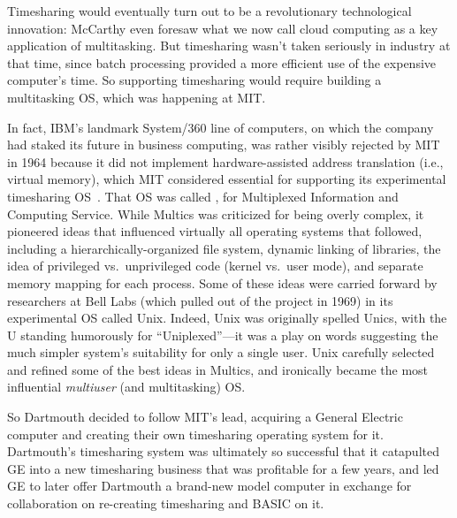 Timesharing would eventually turn out to be a revolutionary
technological innovation: McCarthy even foresaw what we now call cloud
computing as a key application of multitasking.
But timesharing wasn't taken seriously in industry at that time, since batch
processing provided a more efficient use of the expensive computer's
time.  So supporting
timesharing would require building a multitasking OS, which 
was happening at MIT.

  \begin{tangent}
In fact, IBM's landmark System/360 line of computers, on which the
company had staked its future in business computing, was rather visibly
rejected by MIT in 1964 because it did not implement hardware-assisted 
address translation (i.e., virtual memory), which MIT considered
essential for supporting its experimental timesharing
OS~\cite{ibm360history}.  
That OS was called , for
Multiplexed Information and Computing Service.  While Multics was
criticized for being overly complex, it pioneered ideas that influenced
virtually all operating systems that followed, including a
hierarchically-organized file system, dynamic linking of libraries, the
idea of privileged vs.\ unprivileged code (kernel vs.\ user mode), and
separate memory mapping for each process.
Some of these ideas were carried forward by researchers at Bell Labs
(which pulled out 
of the project in 1969) in its experimental OS called Unix.
Indeed, Unix
was originally spelled Unics, with the U standing humorously for
``Uniplexed''---it was a play on words suggesting the much simpler
system's suitability for only a single user.  Unix carefully selected
and refined some of the best ideas in Multics, and ironically
became the most influential \emph{multiuser} (and multitasking) OS.
  \end{tangent}



So Dartmouth decided to
follow MIT's lead, acquiring a General Electric computer
and creating their own timesharing
operating system for it.
Dartmouth's timesharing system was ultimately so successful that it
catapulted GE into a new timesharing business that was profitable for a
few years, and led GE to later offer Dartmouth a brand-new model
computer in exchange for collaboration on re-creating timesharing and
BASIC on it.



